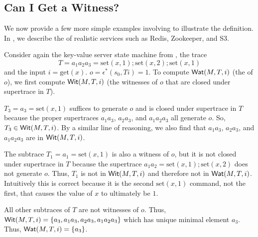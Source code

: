 \subsection{Can I Get a Witness?}
We now provide a few more simple examples involving \watprovenance{} to
illustrate the definition. In , we describe the
\watprovenance{} of realistic services such as Redis, Zookeeper, and S3.

\begin{example}
  \newcommand{\Mget}{\text{get}}
  \newcommand{\Mset}{\text{set}}
  Consider again the key-value server state machine from
  , the trace
  \[
    T = a_1 a_2 a_3 = \Mset(x, 1); \Mset(x, 2); \Mset(x, 1)
  \]
  and the input $i = \Mget(x)$. $o = \epsilon^*(s_0, Ti) = 1$. To compute
  $\textsf{Wat}(M, T, i)$ (the \watprovenance{} of $o$), we first compute $\textsf{Wit}(M, T,
  i)$ (the witnesses of $o$ that are closed under supertrace in $T$).


  $T_3 = a_3 = \Mset(x, 1)$ suffices to generate $o$ and is closed under
  supertrace in $T$ because the proper supertraces $a_1a_3$, $a_2a_3$, and
  $a_1a_2a_3$ all generate $o$. So, $T_3 \in \textsf{Wit}(M, T, i)$. By a similar line
  of reasoning, we also find that $a_1a_3$, $a_2a_3$, and $a_1a_2a_3$ are in
  $\textsf{Wit}(M, T, i)$.

  The subtrace $T_1 = a_1 = \Mset(x, 1)$ is also a witness of $o$, but it is
  not closed under supertrace in $T$ because the supertrace $a_1a_2 = \Mset(x,
  1); \Mset(x, 2)$ does not generate $o$. Thus, $T_1$ is not in $\textsf{Wit}(M, T, i)$
  and therefore not in $\textsf{Wat}(M, T, i)$. Intuitively this is correct because it
  is the second $\Mset(x, 1)$ command, not the first, that causes the value of
  $x$ to ultimately be $1$.

  All other subtraces of $T$ are not witnesses of $o$. Thus, $\textsf{Wit}(M, T, i) =
  \{a_3, a_1a_3, a_2a_3, a_1a_2a_3\}$ which has unique minimal element $a_3$.
  Thus, $\textsf{Wat}(M, T, i) = \{a_3\}$.
\end{example}

